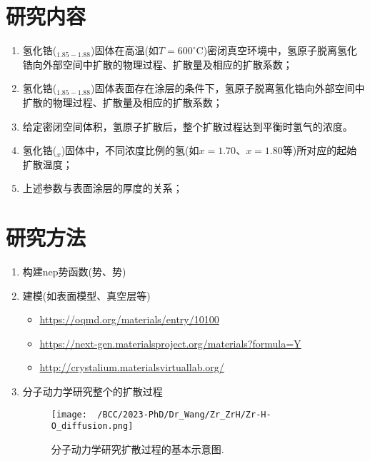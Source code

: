 \section{研究内容}
\begin{enumerate}
	\item 氢化锆($_{1.85-1.88}$)固体在高温(如$T=600^{\circ}\mathrm{C}$)密闭真空环境中，氢原子脱离氢化锆向外部空间中扩散的物理过程、扩散量及相应的扩散系数；

	\item 氢化锆($_{1.85-1.88}$)固体表面存在涂层的条件下，氢原子脱离氢化锆向外部空间中扩散的物理过程、扩散量及相应的扩散系数；

	\item 给定密闭空间体积，氢原子扩散后，整个扩散过程达到平衡时氢气的浓度。

	\item 氢化锆($_x$)固体中，不同浓度比例的氢(如$x=1.70$、$x=1.80$等)所对应的起始扩散温度；

	\item 上述参数与表面涂层的厚度的关系；
\end{enumerate}

\section{研究方法}
\begin{enumerate}
	\item 构建\textrm{nep}势函数(势、势)

	\item 建模(如表面模型、真空层等)
		\begin{itemize}
			\item \url{https://oqmd.org/materials/entry/10100}
			\item \url{https://next-gen.materialsproject.org/materials?formula=Y}
			\item \url{http://crystalium.materialsvirtuallab.org/}
		\end{itemize}
	\item 分子动力学研究整个的扩散过程
\begin{figure}[!ht]
\centering
\vspace*{-0.05in}
\texttt{[image: ~/BCC/2023-PhD/Dr\_Wang/Zr\_ZrH/Zr-H-O\_diffusion.png]}
\caption{分子动力学研究扩散过程的基本示意图.}
\label{Fig:Zr-H-O_diffusion}
\end{figure}
\end{enumerate}

